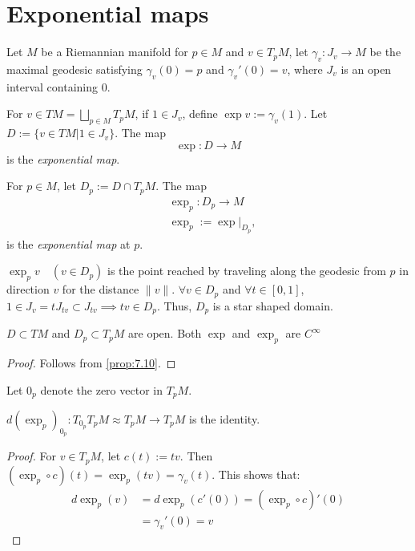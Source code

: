 \section{Exponential maps}
Let $M$ be a Riemannian manifold for $p \in M$ and $v \in T_p M$, let $\gamma_v : J_v \to M$ be the maximal geodesic satisfying
$\gamma_v(0)  =p$ and $\gamma_v'(0) = v$, where $J_v$ is an open interval containing $0$.

\begin{definition}
For $v \in TM = \bigsqcup_{p \in M} T_p M$, if $1 \in J_v$, define $\exp v := \gamma_v(1)$.
Let $D:= \{v \in TM | 1 \in J_v\}$.
The map 
\[
\exp : D \to M
\]
is the \emph{exponential map}.

For $p \in M$, let $D_p := D \cap T_pM$. The map
\[
\begin{aligned}
    &\exp_p : D_p \to M \\
    &\exp_p := \exp|_{D_p},
\end{aligned}
\]
is the \emph{exponential map} at $p$.

$\exp_p v \quad (v \in D_p)$ is the point reached by traveling along the geodesic from $p$ in direction $v$ for the distance $\|v\|$.
$\forall v \in D_p$ and $\forall t \in [0,1]$, $1 \in J_v = t J_{tv} \subset J_{tv} \implies tv \in D_p$.
Thus, $D_p$ is a star shaped domain.
\end{definition}

\begin{proposition}
    $D \subset TM$ and $D_p \subset T_p M$ are open.
    Both $\exp$ and $\exp_p$ are $C^{\infty}$
    \label{prop:10.2}
\end{proposition}
\begin{proof}
Follows from \autoref{prop:7.10}.
\end{proof}

Let $0_p$ denote the zero vector in $T_p M$.
\begin{proposition}
    $d(\exp_p)_{0_p} : T_{0_p} T_p M \approx T_p M \to T_p M$ is the identity.
    \label{prop:10.3}
\end{proposition}

\begin{proof}
    For $v \in T_p M$, let $c(t) := tv$. Then $(\exp_p \circ c)(t) = \exp_p(tv) = \gamma_v(t)$.
    This shows that: 
    \[
    \begin{aligned}
        d \exp_p(v) &= d \exp_p (c'(0))= (\exp_p \circ c)'(0) \\
        &= \gamma_v'(0) = v 
    \end{aligned}
    \]
\end{proof}

